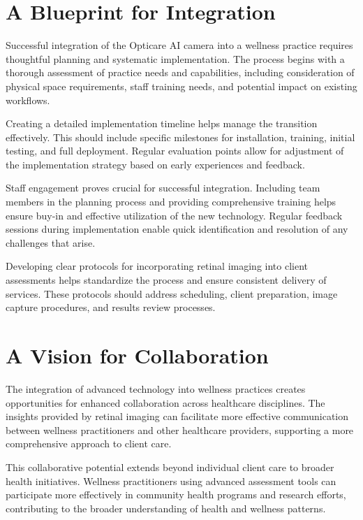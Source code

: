 \documentclass[
  Letterpaper,
]{scrbook}
\begin{document}
\section{A Blueprint for Integration}\label{a-blueprint-for-integration}

Successful integration of the Opticare AI camera into a wellness
practice requires thoughtful planning and systematic implementation. The
process begins with a thorough assessment of practice needs and
capabilities, including consideration of physical space requirements,
staff training needs, and potential impact on existing workflows.

Creating a detailed implementation timeline helps manage the transition
effectively. This should include specific milestones for installation,
training, initial testing, and full deployment. Regular evaluation
points allow for adjustment of the implementation strategy based on
early experiences and feedback.

Staff engagement proves crucial for successful integration. Including
team members in the planning process and providing comprehensive
training helps ensure buy-in and effective utilization of the new
technology. Regular feedback sessions during implementation enable quick
identification and resolution of any challenges that arise.

Developing clear protocols for incorporating retinal imaging into client
assessments helps standardize the process and ensure consistent delivery
of services. These protocols should address scheduling, client
preparation, image capture procedures, and results review processes.

\section{A Vision for Collaboration}\label{a-vision-for-collaboration}

The integration of advanced technology into wellness practices creates
opportunities for enhanced collaboration across healthcare disciplines.
The insights provided by retinal imaging can facilitate more effective
communication between wellness practitioners and other healthcare
providers, supporting a more comprehensive approach to client care.

This collaborative potential extends beyond individual client care to
broader health initiatives. Wellness practitioners using advanced
assessment tools can participate more effectively in community health
programs and research efforts, contributing to the broader understanding
of health and wellness patterns.
\end{document}
